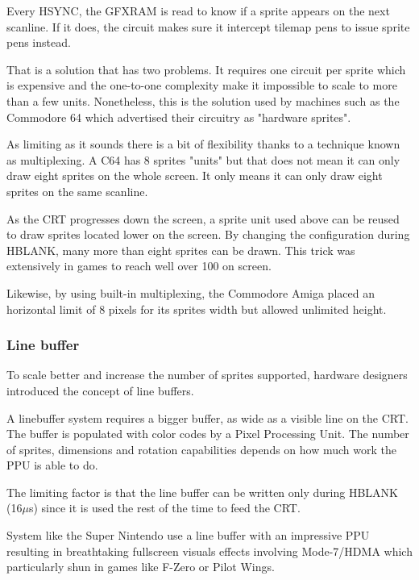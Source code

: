 Every HSYNC, the GFXRAM is read to know if a sprite appears on the next scanline. If it does, the circuit makes sure it intercept tilemap pens to issue sprite pens instead. 

That is a solution that has two problems. It requires one circuit per sprite which is expensive and the one-to-one complexity make it impossible to scale to more than a few units. Nonetheless, this is the solution used by machines such as the Commodore 64 which advertised their circuitry as "hardware sprites".


As limiting as it sounds there is a bit of flexibility thanks to a technique known as multiplexing. A C64 has 8 sprites "units" but that does not mean it can only draw eight sprites on the whole screen. It only means it can only draw eight sprites on the same scanline.

As the CRT progresses down the screen, a sprite unit used above can be reused to draw sprites located lower on the screen. By changing the configuration during HBLANK, many more than eight sprites can be drawn. This trick was extensively in games to reach well over 100 on screen.


Likewise, by using built-in multiplexing, the Commodore Amiga placed an horizontal limit of 8 pixels for its sprites width but allowed unlimited height.

\subsubsection{Line buffer}
To scale better and increase the number of sprites supported, hardware designers introduced the concept of line buffers. 

A linebuffer system requires a bigger buffer, as wide as a visible line on the CRT. The buffer is populated with color codes by a Pixel Processing Unit. The number of sprites, dimensions and rotation capabilities depends on how much work the PPU is able to do. 

The limiting factor is that the line buffer can be written only during HBLANK (16$\mu$s) since it is used the rest of the time to feed the CRT.

System like the Super Nintendo use a line buffer with an impressive PPU resulting in breathtaking fullscreen visuals effects involving Mode-7/HDMA which particularly shun in games like F-Zero or Pilot Wings.









